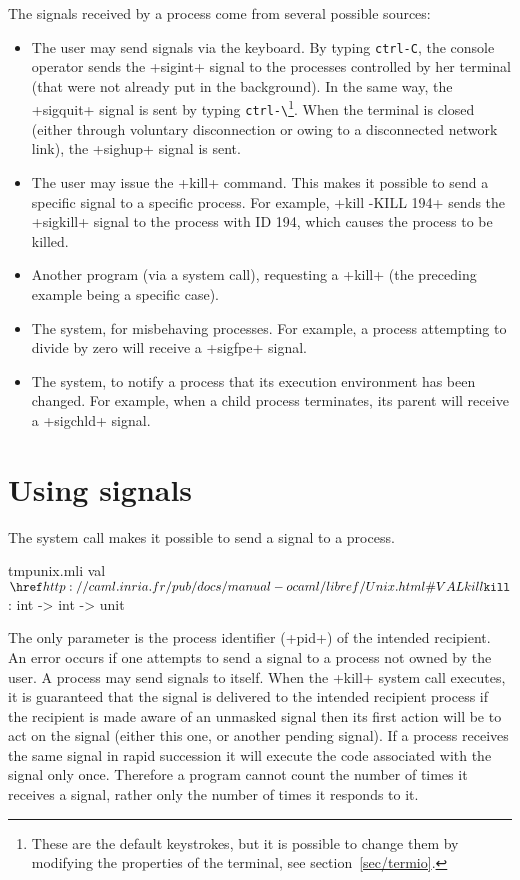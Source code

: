 The signals received by a process come from several possible sources:
%
\begin{itemize}

\item The user may send signals via the keyboard.  By typing \verb'ctrl-C',
  the console operator sends the \ml+sigint+ signal to the processes
  controlled by her terminal (that were not already put in the background).
  In the same way, the \ml+sigquit+ signal is sent by typing \verb'ctrl-\'\footnote{These 
    are the default keystrokes, but it is possible to change them by 
    modifying the properties of the terminal, see section~\ref {sec/termio}.}.  
  When the terminal is closed (either through voluntary disconnection or owing to a disconnected network link), the \ml+sighup+ signal is sent.

\item The user may issue the \ml+kill+ command.  This makes it possible 
  to send a specific signal to a specific process.  For example, 
  \ml+kill -KILL 194+ sends the \ml+sigkill+ signal to the process with ID 194, which 
  causes the process to be killed.

\item Another program (via a system call), requesting a
  \ml+kill+ (the preceding example being a specific case).

\item The system, for misbehaving processes.  For example, a process 
  attempting to divide by zero will receive a \ml+sigfpe+ signal.

\item The system, to notify a process that its execution environment has 
  been changed.  For example, when a child process terminates, its parent 
  will receive a \ml+sigchld+ signal.

\end{itemize}


\section{Using signals}

The system call  makes it possible to send a
signal to a process.

%
\begin{listingcodefile}{tmpunix.mli}
val $\libvalue{Unix}{kill}$ : int -> int -> unit
\end{listingcodefile}
%
The only parameter is the process identifier (\ml+pid+) of the
intended recipient.  An error occurs if one attempts to send a signal
to a process not owned by the user.  A process may send signals to
itself.  When the \ml+kill+ system call executes, it is guaranteed
that the signal is delivered to the intended recipient process
\ie{} if the recipient is made aware of an unmasked signal then its
first action will be to act on the signal (either this one, or another
pending signal). If a process receives the same signal in rapid
succession it will execute the code associated with the signal only
once.  Therefore a program cannot count the number of times it
receives a signal, rather only the number of times it responds to it.

